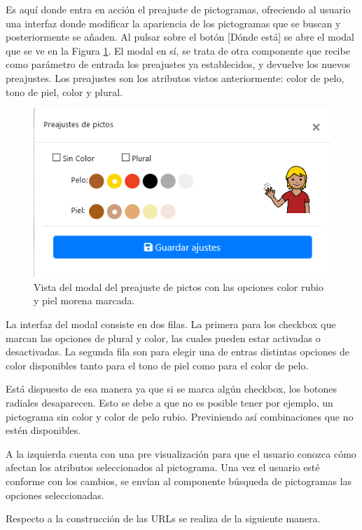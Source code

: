 Es aquí donde entra en acción el preajuste de pictogramas, ofreciendo al usuario una interfaz donde modificar la apariencia de los pictogramas que se buscan y posteriormente se añaden. Al pulsar sobre el botón [Dónde está] se abre el modal que se ve en la Figura \ref{fig:modalpreajustepicto}. El modal en sí, se trata de otra componente que recibe como parámetro de entrada los preajustes ya establecidos, y devuelve los nuevos preajustes. Los preajustes son los atributos vistos anteriormente: color de pelo, tono de piel, color y plural.

\begin{figure}[h!]
	\centering
	\includegraphics[width=0.7\linewidth]{Imagenes/Bitmap/modalPreajustePicto}
	\caption{Vista del modal del preajuste de pictos con las opciones color rubio y piel morena marcada.}
	\label{fig:modalpreajustepicto}
\end{figure}



La interfaz del modal consiste en dos filas. La primera para los checkbox que marcan las opciones de plural y color, las cuales pueden estar activadas o desactivadas. La segunda fila son para elegir una de entras distintas opciones de color disponibles tanto para el tono de piel como para el color de pelo.

Está dispuesto de esa manera ya que si se marca algún checkbox, los botones radiales desaparecen. Esto se debe a que no es posible tener por ejemplo, un pictograma sin color y color de pelo rubio. Previniendo así combinaciones que no estén disponibles.

A la izquierda cuenta con una pre visualización para que el usuario conozca cómo afectan los atributos seleccionados al pictograma. Una vez el usuario esté conforme con los cambios, se envían al componente búsqueda de pictogramas las opciones seleccionadas.

Respecto a la construcción de las URLs se realiza de la siguiente manera.

